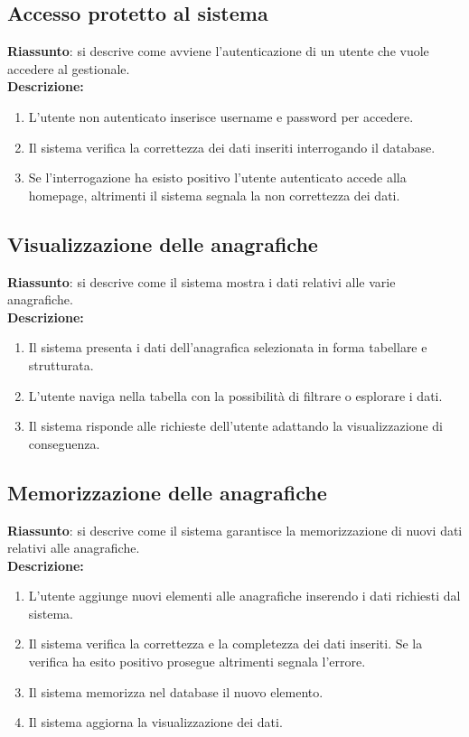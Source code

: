 \subsection{Accesso protetto al sistema}
\textbf{Riassunto}: si descrive come avviene l'autenticazione di un utente che vuole accedere al gestionale.\\
\textbf{Descrizione:}
\begin{enumerate}
  \item L'utente non autenticato inserisce username e password per accedere.
  \item Il sistema verifica la correttezza dei dati inseriti interrogando il database.
  \item Se l'interrogazione ha esisto positivo l'utente autenticato accede alla homepage, altrimenti il sistema segnala la non correttezza dei dati.
\end{enumerate}

\subsection{Visualizzazione delle anagrafiche}
\textbf{Riassunto}: si descrive come il sistema mostra i dati relativi alle varie anagrafiche.\\
\textbf{Descrizione:}
\begin{enumerate}
  \item Il sistema presenta i dati dell'anagrafica selezionata in forma tabellare e strutturata.
  \item L'utente naviga nella tabella con la possibilità di filtrare o esplorare i dati.
  \item Il sistema risponde alle richieste dell'utente adattando la visualizzazione di conseguenza.
\end{enumerate}

\subsection{Memorizzazione delle anagrafiche}
\textbf{Riassunto}: si descrive come il sistema garantisce la memorizzazione di nuovi dati relativi alle anagrafiche.\\
\textbf{Descrizione:}
\begin{enumerate}
  \item L'utente aggiunge nuovi elementi alle anagrafiche inserendo i dati richiesti dal sistema.
  \item Il sistema verifica la correttezza e la completezza dei dati inseriti. Se la verifica ha esito positivo prosegue altrimenti segnala l'errore.
  \item Il sistema memorizza nel database il nuovo elemento.
  \item Il sistema aggiorna la visualizzazione dei dati.
\end{enumerate}

